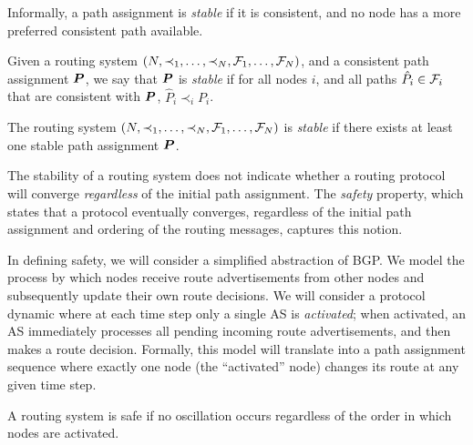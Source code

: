Informally, a path assignment is {\em stable} if it is consistent, and no
node has a more preferred consistent path available.  



\begin{defn}
Given a routing system $(N, \prec_1, \ldots, \prec_N,\lb \F_1,
\ldots, \F_N)$, and a consistent path assignment $\boldsymbol{P}$, we say
that $\boldsymbol{P}$ is {\em stable} if for all nodes $i$, and all paths
$\hat{P}_i \in \mathcal{F}_i$
that are consistent with $\boldsymbol{P}$, $\hat{P}_i \prec_i P_i$.
\end{defn} 

\begin{defn}
The routing system $(N, \prec_1, \ldots, \prec_N, \mathcal{F}_1,
\ldots, \mathcal{F}_N)$ is {\em stable} if there exists at least one stable
path assignment $\boldsymbol{P}$.
\end{defn} 


The stability of a
routing system does not indicate whether a routing protocol will
converge {\em regardless} of the initial path assignment.  The {\em
  safety} property, which states that a
protocol eventually converges, regardless of the initial path
assignment and ordering of the routing messages, captures this notion.

In defining safety, we will consider a simplified abstraction of 
BGP.  We model the process by which
nodes receive route advertisements from other nodes and subsequently update
their own route decisions.  We will consider a protocol
dynamic where at each time step only a single AS is {\em activated};
when activated, an AS immediately processes all pending incoming route
advertisements, and then makes a route decision.  Formally, this model will
translate into a path assignment sequence where exactly one node (the
``activated'' node) changes its route at any given time step.

A routing system is safe if no oscillation occurs
regardless of the order in which nodes are activated.  

